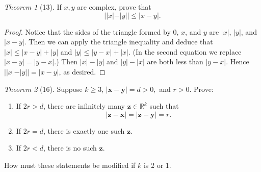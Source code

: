 \documentclass[12pt]{article}
\theoremstyle{remark}
\theoremstyle{named}
\newtheorem*{theorem}{Theorem}
\renewcommand{\bf}{\mathbf}
\begin{document}
\begin{theorem}[13]
If $x, y$ are complex, prove that \[ ||x| - |y||  \le |x - y|.\]
\end{theorem}

\begin{proof}
    Notice that the sides of the triangle formed by $0$, $x$, and $y$ are $|x|$, $|y|$, and $|x - y|$. Then we can apply the triangle inequality and deduce that $|x| \le |x - y| + |y|$ and $|y| \le |y - x| + |x|$. (In the second equation we replace $|x - y| = |y - x|$.) Then $|x| - |y|$ and $|y| - |x|$ are both less than $|y - x|$. Hence $||x| - |y|| = |x - y|$, as desired.
\end{proof}

\begin{theorem}[16]
Suppose $k \ge 3$, $|\bf x - \bf y| = d > 0,$ and $r > 0$. Prove:
    \begin{enumerate}
        \item If $2r > d$, there are infinitely many $\bf z \in \mathbb R^k$ such that \[|\bf z - \bf x| = |\bf z - \bf y| = r.\]
        \item If $2r = d$, there is exactly one such $\bf z $.
        \item If $2r < d$, there is no such $\bf z$. 
    \end{enumerate}
How must these statements be modified if $k$ is 2 or 1.
\end{theorem}
\end{document}
